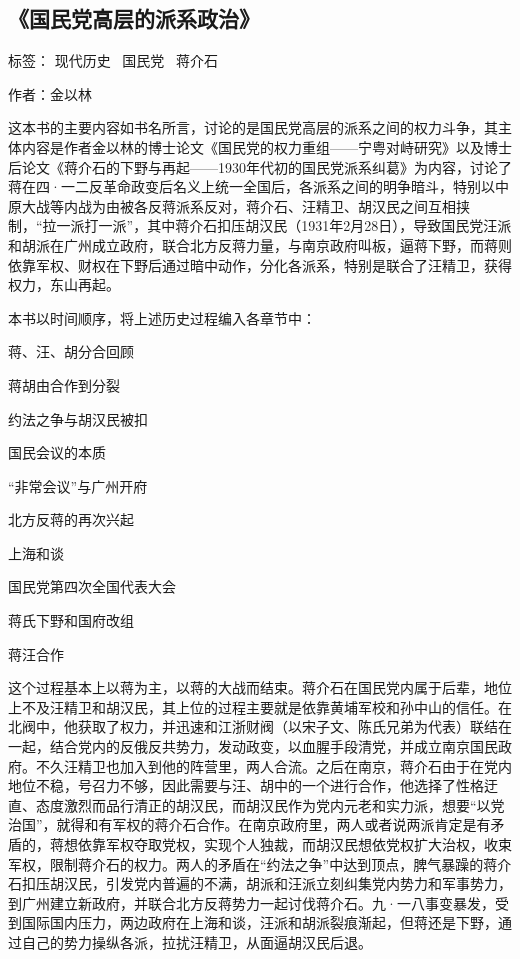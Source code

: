\subsection{《国民党高层的派系政治》}

标签： 现代历史 \ 国民党 \ 蒋介石

作者：金以林

这本书的主要内容如书名所言，讨论的是国民党高层的派系之间的权力斗争，其主体内容是作者金以林的博士论文《国民党的权力重组——宁粤对峙研究》以及博士后论文《蒋介石的下野与再起——1930年代初的国民党派系纠葛》为内容，讨论了蒋在四·一二反革命政变后名义上统一全国后，各派系之间的明争暗斗，特别以中原大战等内战为由被各反蒋派系反对，蒋介石、汪精卫、胡汉民之间互相挟制，“拉一派打一派”，其中蒋介石扣压胡汉民（1931年2月28日），导致国民党汪派和胡派在广州成立政府，联合北方反蒋力量，与南京政府叫板，逼蒋下野，而蒋则依靠军权、财权在下野后通过暗中动作，分化各派系，特别是联合了汪精卫，获得权力，东山再起。

本书以时间顺序，将上述历史过程编入各章节中：

\begin{itemize*}
    \item 蒋、汪、胡分合回顾
    \item 蒋胡由合作到分裂
    \item 约法之争与胡汉民被扣
    \item 国民会议的本质
    \item “非常会议”与广州开府
    \item 北方反蒋的再次兴起
    \item 上海和谈
    \item 国民党第四次全国代表大会
    \item 蒋氏下野和国府改组
    \item 蒋汪合作
\end{itemize*}

这个过程基本上以蒋为主，以蒋的大战而结束。蒋介石在国民党内属于后辈，地位上不及汪精卫和胡汉民，其上位的过程主要就是依靠黄埔军校和孙中山的信任。在北阀中，他获取了权力，并迅速和江浙财阀（以宋子文、陈氏兄弟为代表）联结在一起，结合党内的反俄反共势力，发动政变，以血腥手段清党，并成立南京国民政府。不久汪精卫也加入到他的阵营里，两人合流。之后在南京，蒋介石由于在党内地位不稳，号召力不够，因此需要与汪、胡中的一个进行合作，他选择了性格迂直、态度激烈而品行清正的胡汉民，而胡汉民作为党内元老和实力派，想要“以党治国”，就得和有军权的蒋介石合作。在南京政府里，两人或者说两派肯定是有矛盾的，蒋想依靠军权夺取党权，实现个人独裁，而胡汉民想依党权扩大治权，收束军权，限制蒋介石的权力。两人的矛盾在“约法之争”中达到顶点，脾气暴躁的蒋介石扣压胡汉民，引发党内普遍的不满，胡派和汪派立刻纠集党内势力和军事势力，到广州建立新政府，并联合北方反蒋势力一起讨伐蒋介石。九·一八事变暴发，受到国际国内压力，两边政府在上海和谈，汪派和胡派裂痕渐起，但蒋还是下野，通过自己的势力操纵各派，拉扰汪精卫，从面逼胡汉民后退。

